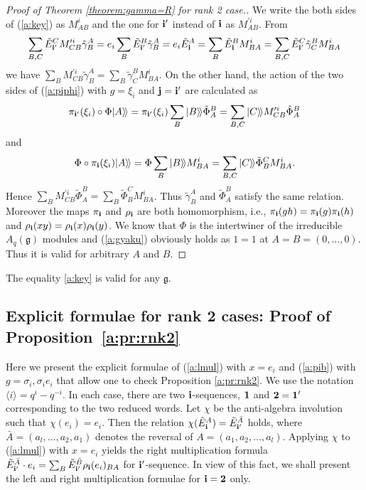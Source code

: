 \documentclass[pdftex]{sigma}
\newcommand{\geh}{\mathfrak{g}}
\def\qmq#1{\langle #1 \rangle}
\begin{document}
\begin{proof}[Proof of Theorem \ref{theorem:gamma=R} for rank 2 case.]
We write the both sides of (\ref{a:key}) as $M^i_{AB}$ and the one
for ${\bf i}'$ instead of ${\bf i}$ as $M^{\prime i}_{AB}$.
From
\begin{gather*}
\sum_{B,C} {\tilde E}^C_{{\bf i}'} M^{\prime i}_{CB}{\tilde \gamma}^A_B=
e_i \sum_B {\tilde E}^B_{{\bf i}'}{\tilde \gamma}^A_B =
e_i {\tilde E}^A_{\bf i} = \sum_B {\tilde E}^{B}_{\bf i}  M^i_{BA}
= \sum_{B,C}{\tilde E}^C_{{\bf i}'}
{\tilde \gamma}^B_C M^i_{BA}
\end{gather*}
we have
$\sum_{B} M^{\prime i}_{CB}{\tilde \gamma}^A_B
= \sum_{B}{\tilde \gamma}^B_CM^i_{BA}$.
On the other hand, the action of the two sides of (\ref{a:piphi}) with
$g=\xi_i$ and
${\bf j}={\bf i}'$ are calculated as
\[
\pi_{{\bf i}'}(\xi_i)\circ \Phi|A\rangle\!\rangle
=\pi_{{\bf i}'}(\xi_i)\sum_B|B\rangle\!\rangle{\tilde \Phi}^B_A
=\sum_{B,C}|C\rangle\!\rangle
M_{CB}^{\prime i}{\tilde \Phi}_A^B
\]
and
\[
\Phi \circ \pi_{{\bf i}}(\xi_i)|A\rangle\!\rangle
=\Phi\sum_B|B\rangle\!\rangle M_{BA}^i
=\sum_{B,C}|C\rangle\!\rangle {\tilde \Phi}_B^C M_{BA}^i.
\]
Hence
$\sum_{B}
M_{CB}^{\prime i}{\tilde \Phi}_A^B
= \sum_{B}{\tilde \Phi}_B^C M_{BA}^i$.
Thus ${\tilde \gamma}^A_B$ and ${\tilde \Phi}^B_A$
satisfy the same relation.
Moreover the maps $\pi_{\bf i}$ and
$\rho_{\bf i}$ are both homomorphism, i.e.,
$\pi_{\bf i}(gh)=\pi_{\bf i}(g)\pi_{\bf i}(h)$
and
$\rho_{\bf i}(xy)=\rho_{\bf i}(x)\rho_{\bf i}(y)$.
We know that ${\Phi}$ is the intertwiner of the
irreducible $A_q(\geh)$ modules and
(\ref{a:gyaku}) obviously holds as $1=1$ at
$A=B=(0,\ldots,0)$.
Thus it is valid for arbitrary $A$ and $B$.
\end{proof}

\begin{conjecture}
The equality \eqref{a:key} is valid for any $\geh$.
\end{conjecture}

\subsection{Explicit formulae for rank 2 cases:
Proof of Proposition~\ref{a:pr:rnk2}}\label{a:ss:rank2}

Here we present the explicit formulae of
(\ref{a:lmul}) with $x=e_i$
and (\ref{a:pib}) with $g=\sigma_i, \sigma_ie_i$ that allow one to check
Proposition \ref{a:pr:rnk2}.
We use the notation $\qmq{i}=q^i-q^{-i}$.
In each case, there are two ${\bf i}$-sequences,
${\bf 1}$ and ${\bf 2}={\bf 1}'$
corresponding to the two reduced words.
Let $\chi$ be the anti-algebra involution
such that $\chi(e_i)=e_i$.
Then the relation
$\chi({\tilde E}^{A}_{\bf i}) = {\tilde E}^{\bar A}_{{\bf i}'}$ holds,
where ${\bar A} = (a_l,\ldots, a_2,a_1)$ denotes the reversal of
$A=(a_1,a_2,\ldots, a_l)$.
Applying $\chi$ to (\ref{a:lmul}) with $x=e_i$ yields the
right multiplication formula
${\tilde E}^{\bar A}_{{\bf i}'}\cdot e_i  = \sum_B  {\tilde E}^{\bar B}_{{\bf i}'}
\rho_{\bf i}(e_i)_{BA}$ for ${\bf i}'$-sequence.
In view of this fact, we shall present
the left and right multiplication formulae
for ${\bf i}={\bf 2}$ only.
\end{document}
